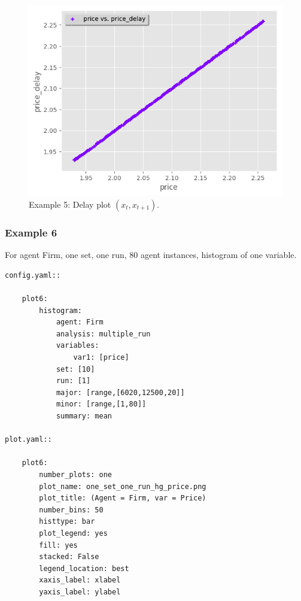 \documentclass[10pt,a4paper]{article}
\begin{document}
\begin{figure}[b!]\centering\leavevmode
\includegraphics[scale=.7]{./plots_tut_2/one_set_multiple_runs_sp_price_delay_0.png}
\caption{\footnotesize  Example 5: Delay plot $(x_t, x_{t+1})$.}
\end{figure}

\clearpage
\subsubsection{Example 6}
For agent Firm, one set, one run, 80 agent instances, histogram of one variable.

\begin{lstlisting}
config.yaml::

    plot6:
        histogram:
            agent: Firm
            analysis: multiple_run
            variables:
                var1: [price]
            set: [10]
            run: [1]
            major: [range,[6020,12500,20]]
            minor: [range,[1,80]] 
            summary: mean

plot.yaml::

    plot6:
        number_plots: one
        plot_name: one_set_one_run_hg_price.png
        plot_title: (Agent = Firm, var = Price)
        number_bins: 50
        histtype: bar
        plot_legend: yes
        fill: yes
        stacked: False
        legend_location: best
        xaxis_label: xlabel
        yaxis_label: ylabel
\end{lstlisting}
\end{document}
